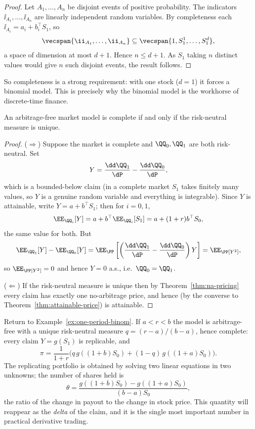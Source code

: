 \begin{proof}
	Let $A_1,\dots,A_n$ be disjoint events of positive probability. The indicators $\ii_{A_1},\dots,\ii_{A_n}$ are linearly independent random variables. By completeness each $\ii_{A_i} = a_i + b_i^\top S_1$, so
	$$
	\vecspan\{\ii_{A_1},\dots,\ii_{A_n}\} \subseteq \vecspan\{1, S_1^1,\dots,S_1^d\},
	$$
	a space of dimension at most $d+1$. Hence $n \leq d+1$. As $S_1$ taking $n$ distinct values would give $n$ such disjoint events, the result follows.
\end{proof}

So completeness is a strong requirement: with one stock ($d=1$) it forces a binomial model. This is precisely why the binomial model is the workhorse of discrete-time finance.

\begin{theorem}\label{thm:ftap2}
	An arbitrage-free market model is complete if and only if the risk-neutral measure is unique.
\end{theorem}

\begin{proof}
	($\Rightarrow$) Suppose the market is complete and $\QQ_0, \QQ_1$ are both risk-neutral. Set
	$$
	Y = \frac{\dd\QQ_1}{\dP} - \frac{\dd\QQ_0}{\dP},
	$$
	which is a bounded-below claim (in a complete market $S_1$ takes finitely many values, so $Y$ is a genuine random variable and everything is integrable). Since $Y$ is attainable, write $Y = a + b^\top S_1$; then for $i = 0,1$,
	$$
	\EE_{\QQ_i}[Y] = a + b^\top\EE_{\QQ_i}[S_1] = a + (1+r)b^\top S_0,
	$$
	the same value for both. But
	$$
	\EE_{\QQ_1}[Y] - \EE_{\QQ_0}[Y] = \EE_\PP\left[\left(\frac{\dd \QQ_1}{\dP} - \frac{\dd\QQ_0}{\dP}\right)Y\right] = \EE_\PP[Y^2],
	$$
	so $\EE_\PP[Y^2] = 0$ and hence $Y = 0$ a.s., i.e.\ $\QQ_0 = \QQ_1$.

	($\Leftarrow$) If the risk-neutral measure is unique then by Theorem~\ref{thm:na-pricing} every claim has exactly one no-arbitrage price, and hence (by the converse to Theorem~\ref{thm:attainable-price}) is attainable.
\end{proof}

\begin{example}
	Return to Example~\ref{ex:one-period-binom}. If $a < r < b$ the model is arbitrage-free with a unique risk-neutral measure $q = (r-a)/(b-a)$, hence complete: every claim $Y = g(S_1)$ is replicable, and
	$$
	\pi = \frac{1}{1+r}\Big(q\,g((1+b)S_0) + (1-q)\,g((1+a)S_0)\Big).
	$$
	The replicating portfolio is obtained by solving two linear equations in two unknowns; the number of shares held is
	$$
	\theta = \frac{g((1+b)S_0) - g((1+a)S_0)}{(b-a)S_0},
	$$
	the ratio of the change in payout to the change in stock price. This quantity will reappear as the \emph{delta} of the claim, and it is the single most important number in practical derivative trading.
\end{example}

